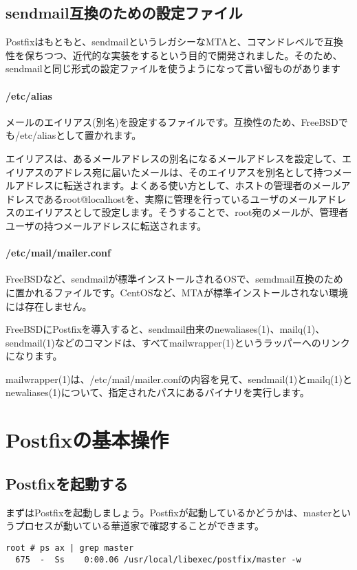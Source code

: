 \subsection{sendmail互換のための設定ファイル}
Postfixはもともと、sendmailというレガシーなMTAと、コマンドレベルで互換性を保ちつつ、近代的な実装をするという目的で開発されました。そのため、sendmailと同じ形式の設定ファイルを使うようになって言い留ものがあります

\paragraph{/etc/alias}
メールのエイリアス(別名)を設定するファイルです。互換性のため、FreeBSDでも/etc/aliasとして置かれます。

エイリアスは、あるメールアドレスの別名になるメールアドレスを設定して、エイリアスのアドレス宛に届いたメールは、そのエイリアスを別名として持つメールアドレスに転送されます。よくある使い方として、ホストの管理者のメールアドレスであるroot@localhostを、実際に管理を行っているユーザのメールアドレスのエイリアスとして設定します。そうすることで、root宛のメールが、管理者ユーザの持つメールアドレスに転送されます。

\paragraph{/etc/mail/mailer.conf}
FreeBSDなど、sendmailが標準インストールされるOSで、semdmail互換のために置かれるファイルです。CentOSなど、MTAが標準インストールされない環境には存在しません。

FreeBSDにPostfixを導入すると、sendmail由来のnewaliases(1)、mailq(1)、sendmail(1)などのコマンドは、すべてmailwrapper(1)というラッパーへのリンクになります。

mailwrapper(1)は、/etc/mail/mailer.confの内容を見て、sendmail(1)とmailq(1)とnewaliases(1)について、指定されたパスにあるバイナリを実行します。


\section{Postfixの基本操作}

\subsection{Postfixを起動する}
まずはPostfixを起動しましょう。Postfixが起動しているかどうかは、masterというプロセスが動いている華道家で確認することができます。

\begin{lstlisting}[basicstyle=\ttfamily\footnotesize, frame=single]
root # ps ax | grep master
  675  -  Ss    0:00.06 /usr/local/libexec/postfix/master -w
\end{lstlisting}

